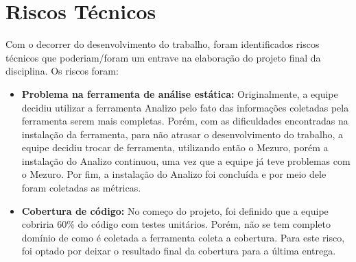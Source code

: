\chapter[Riscos Técnicos]{Riscos Técnicos}
Com o decorrer do desenvolvimento do trabalho, foram identificados riscos técnicos que poderiam/foram um entrave na elaboração do projeto final da disciplina. Os riscos foram:

\begin{itemize}
\item \textbf{Problema na ferramenta de análise estática:} Originalmente, a equipe decidiu utilizar a ferramenta Analizo pelo fato das informações coletadas pela ferramenta serem mais completas. Porém, com as dificuldades encontradas na instalação da ferramenta, para não atrasar o desenvolvimento do trabalho, a equipe decidiu trocar de ferramenta, utilizando então o Mezuro, porém a instalação do Analizo continuou, uma vez que a equipe já teve problemas com o Mezuro. Por fim, a instalação do Analizo foi concluída e por meio dele foram coletadas as métricas.
\item \textbf{Cobertura de código:} No começo do projeto, foi definido que a equipe cobriria 60\% do código com testes unitários. Porém, não se tem completo domínio de como é coletada a ferramenta coleta a cobertura. Para este risco, foi optado por deixar o resultado final da cobertura para a última entrega.
\end{itemize}